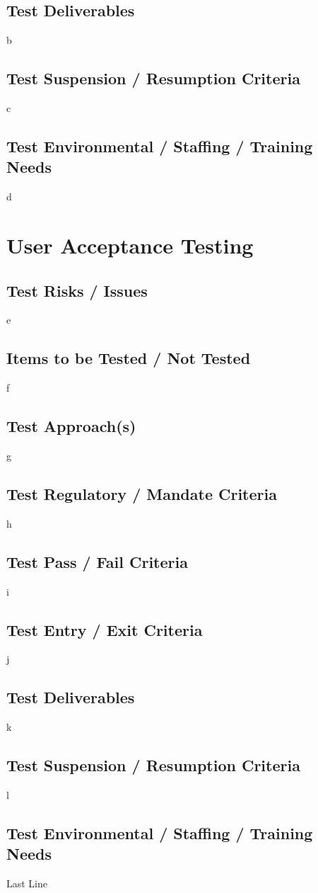 \documentclass{article}
\begin{document}
\subsection{Test Deliverables}
b

\subsection{Test Suspension / Resumption Criteria}
c

\subsection{Test Environmental / Staffing / Training Needs}
d

\section{User Acceptance Testing}
\subsection{Test Risks / Issues}
e

\subsection{Items to be Tested / Not Tested}
f

\subsection{Test Approach(s)}
g

\subsection{Test Regulatory / Mandate Criteria}
h

\subsection{Test Pass / Fail Criteria}
i

\subsection{Test Entry / Exit Criteria}
j

\subsection{Test Deliverables}
k

\subsection{Test Suspension / Resumption Criteria}
l

\subsection{Test Environmental / Staffing / Training Needs}
Last Line
\end{document}
